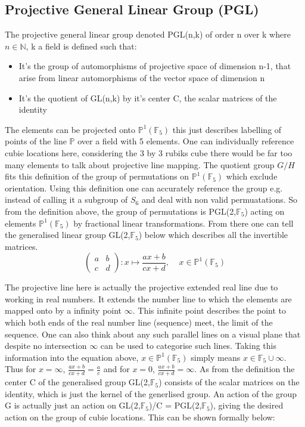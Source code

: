 \documentclass{article}
\begin{document}
\subsection*{Projective General Linear Group (PGL)}
The projective general linear group denoted PGL(n,k) of order n over k where $n \in \mathbb{N}$, k a field is defined such that:
\begin{itemize}
\item It's the group of automorphisms of projective space of dimension n-1, that arise from linear automorphisms of the vector space of dimension n
\item It's the quotient of GL(n,k) by it's center C, the scalar matrices of the identity
\end{itemize} 

The elements can be projected onto $\mathbb{P}^{1}(\mathbb{F}_5)$ this just describes labelling of points of the line $\mathbb{P}$ over a field with 5 elements. One can individually reference cubie locations here, considering the 3 by 3 rubiks cube there would be far too many elements to talk about projective line mapping. The quotient group $G/H$ fits this definition of the group of permutations on $\mathbb{P}^{1}(\mathbb{F}_5)$ which exclude orientation. Using this definition one can accurately reference the group e.g. instead of calling it a subgroup of $S_6$ and deal with non valid permuatations. So from the definition above, the group of permutations is PGL(2,$\mathbb{F}_5$) acting on elements $\mathbb{P}^{1}(\mathbb{F}_5)$ by fractional linear  transformations. From there one can tell the generalised linear group GL(2,$\mathbb{F}_5$) below which describes all the invertible matrices.
\begin{equation}
\begin{pmatrix} a & b \\ c & d \end{pmatrix} : x \mapsto \frac{ax + b}{cx + d},\ \ \ \ \ x \in \mathbb{P}^{1}(\mathbb{F}_5)
\end{equation}

The projective line here is actually the projective extended real line due to working in real numbers. It extends the number line to which the elements are mapped onto by a infinity point $\infty$. This infinite point describes the point to which both ends of the real number line (sequence) meet, the limit of the sequence. One can also think about any such parallel lines on a visual plane that despite no intersection $\infty$ can be used to categorise such lines. Taking this information into the equation above, $x \in \mathbb{P}^{1}(\mathbb{F}_5)$ simply means $x \in \mathbb{F}_5 \cup \infty$. Thus for $x = \infty$, $\frac{ax + b}{cx + d} = \frac{a}{c}$ and for $x = 0$, $\frac{ax + b}{cx + d} = \infty$. As from the definition the center C of the generalised group GL(2,$\mathbb{F}_5$) consists of the scalar matrices on the identity, which is just the kernel of the generlised group. An action of the group G is actually just an action on GL(2,$\mathbb{F}_5$)/C = PGL(2,$\mathbb{F}_5$), giving the desired action on the group of cubie locations. This can be shown formally below:
\end{document}
